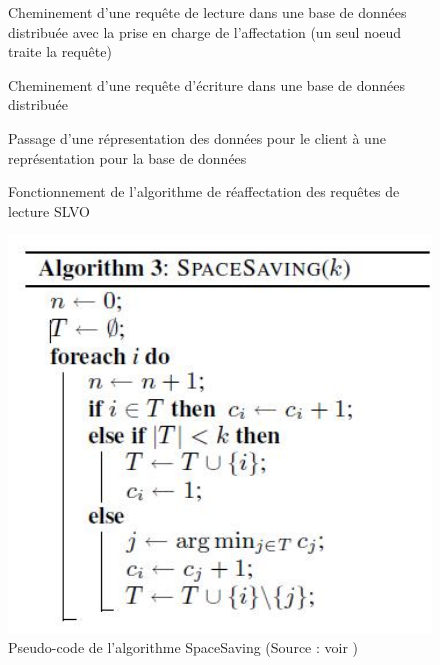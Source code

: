 \documentclass[12pt]{article}
\begin{document}
\begin{figure}[H]
	\centering
		
	\caption{Cheminement d'une requête de lecture dans une base de données distribuée avec la prise en charge de l'affectation (un seul noeud traite la requête)\label{fig:request}}
\end{figure}

\begin{figure}[H]
	\centering
		
	\caption{Cheminement d'une requête d'écriture dans une base de données distribuée\label{fig:write_request}}
\end{figure}

\begin{figure}[H]
	\centering
		
	\caption{Passage d'une répresentation des données pour le client à une représentation pour la base de données\label{fig:token}}
\end{figure}

\begin{figure}[H]
	\centering
		
	\caption{Fonctionnement de l'algorithme de réaffectation des requêtes de lecture SLVO\label{fig:reaffectation}}
\end{figure}

\begin{figure}[H]
	\centering
        \includegraphics[width=12cm]{images/besoins/code_spaceSaving.jpg}
    \caption{Pseudo-code de l'algorithme SpaceSaving (Source : voir \cite{SpaceSaving2}) \label{fig:codeSpaceSaving}}
\end{figure}
\end{document}
